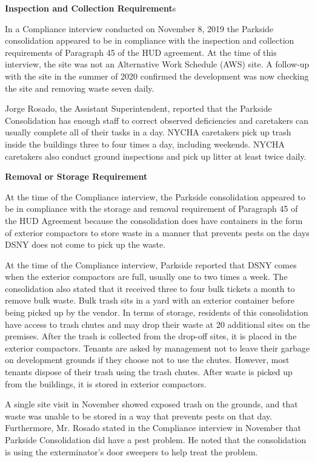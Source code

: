 
\textbf{Inspection and Collection Requirement}s



In a Compliance interview conducted on November 8, 2019 the Parkside consolidation appeared to be in compliance with the inspection and collection requirements of Paragraph 45 of the HUD agreement. At the time of this interview, the site was not an Alternative Work Schedule (AWS) site. A follow-up with the site in the summer of 2020 confirmed the development was now checking the site and removing waste seven daily.

Jorge Rosado, the Assistant Superintendent, reported that the Parkside Consolidation has enough staff to correct observed deficiencies and caretakers can usually complete all of their tasks in a day. NYCHA caretakers pick up trash inside the buildings three to four times a day, including weekends. NYCHA caretakers also conduct ground inspections and pick up litter at least twice daily. 

\textbf{Removal or Storage Requirement}



At the time of the Compliance interview, the Parkside consolidation appeared to be in compliance with the storage and removal requirement of Paragraph 45 of the HUD Agreement because the consolidation does have containers in the form of exterior compactors to store waste in a manner that prevents pests on the days DSNY does not come to pick up the waste.  



At the time of the Compliance interview, Parkside reported that DSNY comes when the exterior compactors are full, usually one to two times a week. The consolidation also stated that it received three to four bulk tickets a month to remove bulk waste. Bulk trash sits in a yard with an exterior container before being picked up by the vendor. In terms of storage, residents of this consolidation have access to trash chutes and may drop their waste at 20 additional sites on the premises. After the trash is collected from the drop-off sites, it is placed in the exterior compactors. Tenants are asked by management not to leave their garbage on development grounds if they choose not to use the chutes. However, most tenants dispose of their trash using the trash chutes. After waste is picked up from the buildings, it is stored in exterior compactors.



A single site visit in November showed exposed trash on the grounds, and that waste was unable to be stored in a way that prevents pests on that day. Furthermore, Mr. Rosado stated in the Compliance interview in November that Parkside Consolidation did have a pest problem. He noted that the consolidation is using the exterminator's door sweepers to help treat the problem.

